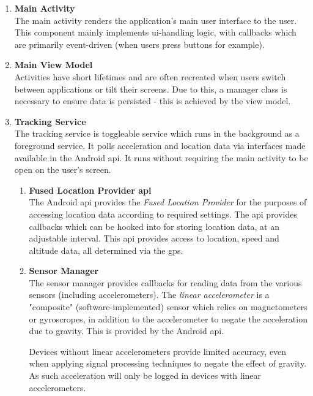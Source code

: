 \begin{enumerate}
\item \textbf{Main Activity}\\
The main activity renders the application's main user interface to the user.
This component mainly implements \Ac{ui}-handling logic, with callbacks which are primarily event-driven (when users press buttons for example).
\item \textbf{Main View Model}\\
Activities have short lifetimes and are often recreated when users switch between applications or tilt their screens.
Due to this, a manager class is necessary to ensure data is persisted - this is achieved by the view model.
\item \textbf{Tracking Service}\\
The tracking service is toggleable service which runs in the background as a foreground service.
It polls acceleration and location data via interfaces made available in the Android \ac{api}.
It runs without requiring the main activity to be open on the user's screen.
\begin{enumerate}
\item \textbf{Fused Location Provider \ac{api}}\\
The Android \ac{api} provides the \textit{Fused Location Provider} for the purposes of accessing location data according to required settings.
The \ac{api} provides callbacks which can be hooked into for storing location data, at an adjustable interval.
This \ac{api} provides access to location, speed and altitude data, all determined via the \ac{gps}.

\item \textbf{Sensor Manager}\\
The sensor manager provides callbacks for reading data from the various sensors (including accelerometers).
The \textit{linear accelerometer} is a "composite" (software-implemented) sensor which relies on magnetometers or gyroscropes, in addition to the accelerometer to negate the acceleration due to gravity.
This is provided by the Android \ac{api}.

Devices without linear accelerometers provide limited accuracy, even when applying signal processing techniques to negate the effect of gravity.
As such acceleration will only be logged in devices with linear accelerometers.
\end{enumerate}


\end{enumerate}
